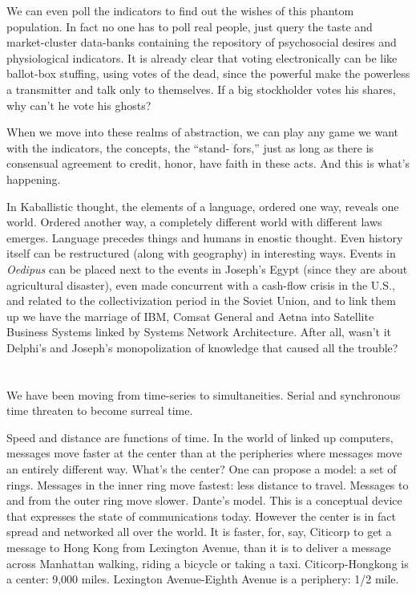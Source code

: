 \documentclass[11pt,twoside,draft]{memoir}
\begin{document}
We can even poll the indicators to find out
the wishes of this phantom population. In
fact no one has to poll real people, just query
the taste and market-cluster data-banks containing the repository of psychosocial desires and physiological indicators. It is already clear that voting electronically can be
like ballot-box stuffing, using votes of the
dead, since the powerful make the powerless
a transmitter and talk only to themselves. If a
big stockholder votes his shares, why can't
he vote his ghosts?

When we move into these realms of abstraction, we can play any game we want
with the indicators, the concepts, the \enquote{stand- fors,} just as long as there is consensual
agreement to credit, honor, have faith in
these acts. And this is what's happening.

In Kaballistic thought, the elements of a
language, ordered one way, reveals one
world. Ordered another way, a completely
different world with different laws emerges.
Language precedes things and humans in
enostic thought. Even history itself can be
restructured (along with geography) in interesting ways. Events in \emph{Oedipus} can be
placed next to the events in Joseph's Egypt
(since they are about agricultural disaster),
even made concurrent with a cash-flow
crisis in the U.S., and related to the collectivization period in the Soviet Union, and
to link them up we have the marriage of IBM,
Comsat General and Aetna into Satellite
Business
Systems linked by Systems Network Architecture. After all, wasn't it Delphi's and Joseph's monopolization of knowledge that caused all the trouble?

\chapter{}%

We have been moving from time-series to
simultaneities. Serial and synchronous time
threaten to become surreal time.

Speed and distance are functions of time.
In the world of linked up computers, messages move faster at the center than at the
peripheries where messages move an entirely different way. What's the center? One
can propose a model: a set of rings. Messages
in the inner ring move fastest: less distance
to travel. Messages to and from the outer ring
move slower. Dante's model. This is a conceptual device that expresses the state of
communications today. However the center
is in fact spread and networked all over the
world. It is faster, for, say, Citicorp to get a
message to Hong Kong from Lexington Avenue, than it is to deliver a message across
Manhattan walking, riding a bicycle or taking a taxi. Citicorp-Hongkong is a center:
9,000 miles. Lexington Avenue-Eighth Avenue is a periphery: 1/2 mile.
\end{document}
